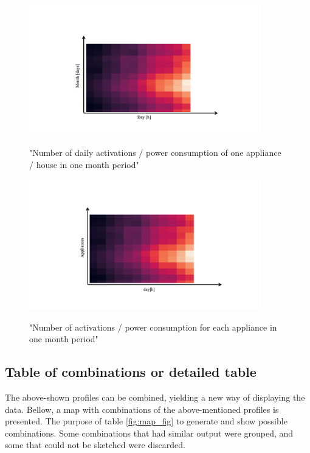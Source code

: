 \begin{figure}[H]
	\centering
	\caption{"Number of daily activations / power consumption of one appliance / house in one month period"}
	\includegraphics[width=0.9\textwidth]{Figures/profile_sketches/Slide10.png}
	\label{fig:heatmap_2dtime}
\end{figure}
\begin{figure}[H]
	\centering
	\caption{"Number of activations / power consumption for each appliance in one month period"}
	\includegraphics[width=0.9\textwidth]{Figures/profile_sketches/Slide12.png}
	\label{fig:heatmap_all_appl}
\end{figure}

\subsection{Table of combinations or detailed table}

The above-shown profiles can be combined, yielding a new way of displaying the data.
Bellow, a map with combinations of the above-mentioned profiles is presented. 
The purpose of table \ref{fig:map_fig} to generate and show possible combinations.
Some combinations that had similar output were grouped, and some that could not be sketched were discarded. 

